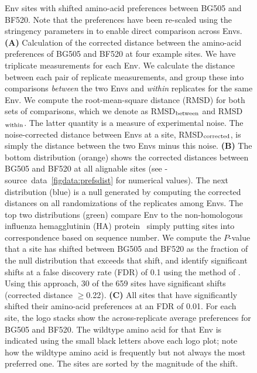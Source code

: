 \documentclass[9pt]{elife}
\begin{document}
\begin{figure}
\begin{fullwidth}
\caption{\label{fig:prefsdist}
Env sites with shifted amino-acid preferences between BG505 and BF520.
Note that the preferences have been re-scaled using the stringency parameters in  to enable direct comparison across Envs.
{\bf (A)} Calculation of the corrected distance between the amino-acid preferences of BG505 and BF520 at four example sites.
We have triplicate measurements for each Env.
We calculate the distance between each pair of replicate measurements, and group these into comparisons \emph{between} the two Envs and \emph{within} replicates for the same Env.
We compute the root-mean-square distance (RMSD) for both sets of comparisons, which we denote as RMSD$_{\rm{between}}$ and RMSD$_{\rm{within}}$.
The latter quantity is a measure of experimental noise.
The noise-corrected distance between Envs at a site, RMSD$_{\rm{corrected}}$, is simply the distance between the two Envs minus this noise.
{\bf (B)} The bottom distribution (orange) shows the corrected distances between BG505 and BF520 at all alignable sites (see -source~data~\ref{figdata:prefsdist} for numerical values).
The next distribution (blue) is a null generated by computing the corrected distances on all randomizations of the replicates among Envs.
The top two distributions (green) compare Env to the non-homologous influenza hemagglutinin (HA) protein~\citep{doud2016accurate} simply putting sites into correspondence based on sequence number.
We compute the $P$-value that a site has shifted between BG505 and BF520 as the fraction of the null distribution that exceeds that shift, and identify significant shifts at a false discovery rate (FDR) of 0.1 using the method of \citet{benjamini1995controlling}.
Using this approach, 30 of the 659 sites have significant shifts (corrected distance $\ge$0.22).
{\bf (C)} All sites that have significantly shifted their amino-acid preferences at an FDR of 0.01.
For each site, the logo stacks show the across-replicate average preferences for BG505 and BF520.
The wildtype amino acid for that Env is indicated using the small black letters above each logo plot; note how the wildtype amino acid is frequently but not always the most preferred one.
The sites are sorted by the magnitude of the shift.
}
\end{fullwidth}
\end{figure}
\end{document}
